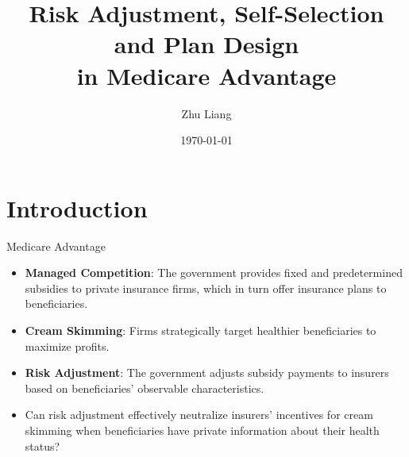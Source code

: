 \documentclass[professionalfonts, aspectratio=169]{beamer}
\title{Risk Adjustment, Self-Selection and Plan Design \\ in Medicare Advantage}
\institute{Stony Brook University}
\author{Zhu Liang}
\date{\today}
\begin{document}

\begin{frame} %
    \titlepage
\end{frame}

\section{Introduction}

\begin{frame}{Medicare Advantage}
  \begin{itemize}
    \item \textbf{Managed Competition}: The government provides fixed and predetermined subsidies to private insurance firms, which in turn offer insurance plans to beneficiaries.
    \item \textbf{Cream Skimming}: Firms strategically target healthier beneficiaries to maximize profits.
    \item \textbf{Risk Adjustment}: The government adjusts subsidy payments to insurers based on beneficiaries' observable characteristics.
    \item Can risk adjustment effectively neutralize insurers' incentives for cream skimming when beneficiaries have private information about their health status?
  \end{itemize}
\end{frame}
\end{document}
